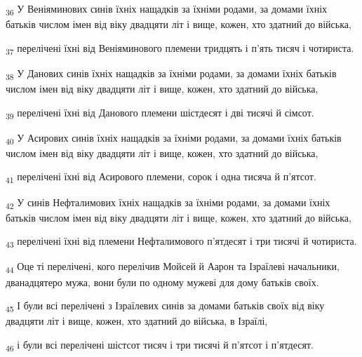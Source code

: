 \begin{tcolorbox}
\textsubscript{36} У Веніяминових синів їхніх нащадків за їхніми родами, за домами їхніх батьків числом імен від віку двадцяти літ і вище, кожен, хто здатний до війська,
\end{tcolorbox}
\begin{tcolorbox}
\textsubscript{37} перелічені їхні від Веніяминового племени тридцять і п'ять тисяч і чотириста.
\end{tcolorbox}
\begin{tcolorbox}
\textsubscript{38} У Данових синів їхніх нащадків за їхніми родами, за домами їхніх батьків числом імен від віку двадцяти літ і вище, кожен, хто здатний до війська,
\end{tcolorbox}
\begin{tcolorbox}
\textsubscript{39} перелічені їхні від Данового племени шістдесят і дві тисячі й сімсот.
\end{tcolorbox}
\begin{tcolorbox}
\textsubscript{40} У Асирових синів їхніх нащадків за їхніми родами, за домами їхніх батьків числом імен від віку двадцяти літ і вище, кожен, хто здатний до війська,
\end{tcolorbox}
\begin{tcolorbox}
\textsubscript{41} перелічені їхні від Асирового племени, сорок і одна тисяча й п'ятсот.
\end{tcolorbox}
\begin{tcolorbox}
\textsubscript{42} У синів Нефталимових їхніх нащадків за їхніми родами, за домами їхніх батьків числом імен від віку двадцяти літ і вище, кожен, хто здатний до війська,
\end{tcolorbox}
\begin{tcolorbox}
\textsubscript{43} перелічені їхні від племени Нефталимового п'ятдесят і три тисячі й чотириста.
\end{tcolorbox}
\begin{tcolorbox}
\textsubscript{44} Оце ті перелічені, кого перелічив Мойсей й Аарон та Ізраїлеві начальники, дванадцятеро мужа, вони були по одному мужеві для дому батьків своїх.
\end{tcolorbox}
\begin{tcolorbox}
\textsubscript{45} І були всі перелічені з Ізраїлевих синів за домами батьків своїх від віку двадцяти літ і вище, кожен, хто здатний до війська, в Ізраїлі,
\end{tcolorbox}
\begin{tcolorbox}
\textsubscript{46} і були всі перелічені шістсот тисяч і три тисячі й п'ятсот і п'ятдесят.
\end{tcolorbox}

